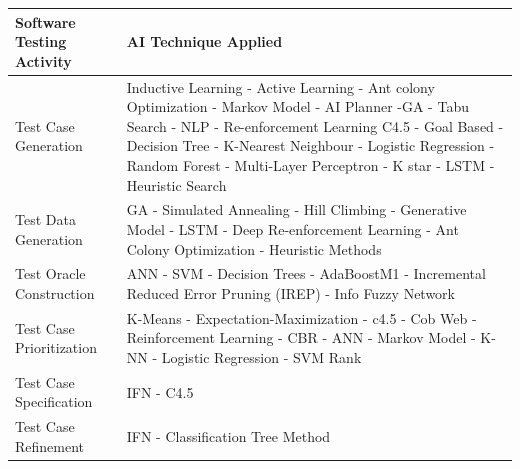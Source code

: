 \documentclass[12pt]{article}
\begin{document}
\begin{table}[]
\begin{tabular}{|p{5cm}|p{10cm}|}
\hline
\textbf{Software Testing Activity} & \textbf{AI Technique Applied}                                                                                                                                                                                                                                                                          \\ \hline
Test Case Generation               & Inductive Learning - Active Learning - Ant colony Optimization - Markov Model - AI Planner -GA - Tabu Search - NLP - Re-enforcement Learning C4.5 - Goal Based - Decision Tree - K-Nearest Neighbour - Logistic Regression - Random Forest - Multi-Layer Perceptron - K star - LSTM - Heuristic Search \\ \hline
Test Data Generation               & GA - Simulated Annealing - Hill Climbing - Generative Model - LSTM - Deep Re-enforcement Learning - Ant Colony Optimization - Heuristic Methods                                                                                                                                                        \\ \hline
Test Oracle Construction           & ANN - SVM - Decision Trees - AdaBoostM1 - Incremental Reduced Error Pruning (IREP) - Info Fuzzy Network                                                                                                                                                                                                \\ \hline
Test Case Prioritization           & K-Means - Expectation-Maximization - c4.5 - Cob Web - Reinforcement Learning - CBR - ANN - Markov Model - K-NN - Logistic Regression - SVM Rank                                                                                                                                                        \\ \hline
Test Case Specification            & IFN - C4.5                                                                                                                                                                                                                                                                                             \\ \hline
Test Case Refinement               & IFN - Classification Tree Method                                                                                                                                                                                                                                                                       \\ \hline

\end{tabular}
\end{table}
\end{document}
